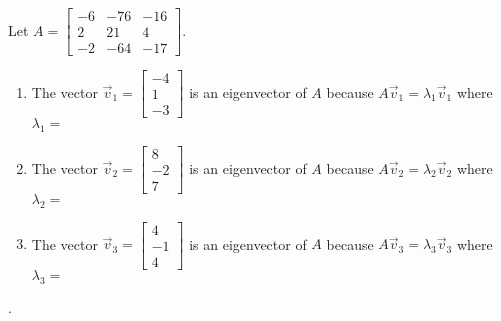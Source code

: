 \documentclass{ximera}
\author{}
\begin{document}
\begin{exercise}
Let $A=\begin{bmatrix} -6 & -76 & -16 \\ 2 & 21 & 4 \\ -2 & -64 & -17 \end{bmatrix}$.

\begin{enumerate}
    \item The vector $\vec{v}_1=\begin{bmatrix}-4\\1\\-3\end{bmatrix}$ is an eigenvector of $A$ because $A\vec{v}_1= \lambda_1 \vec{v}_1$ where $\lambda_1 = $
 \begin{multipleChoice}
 \end{multipleChoice}

\item The vector $\vec{v}_2=\begin{bmatrix}8\\-2\\7\end{bmatrix}$ is an eigenvector of $A$ because $A\vec{v}_2= \lambda_2 \vec{v}_2$ where $\lambda_2 = $
 \begin{multipleChoice}
 \end{multipleChoice}

\item The vector $\vec{v}_3=\begin{bmatrix}4\\-1\\4\end{bmatrix}$ is an eigenvector of $A$ because $A\vec{v}_3= \lambda_3 \vec{v}_3$ where $\lambda_3 = $
 \begin{multipleChoice}
 \end{multipleChoice}

\end{enumerate}


.

 \end{exercise}
 
\end{document}
